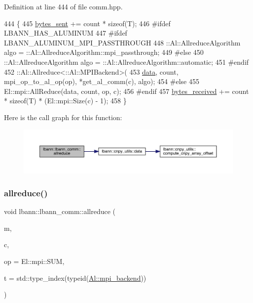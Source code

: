 Definition at line 444 of file comm.\+hpp.


\begin{DoxyCode}
444                                                                                \{
445     \hyperlink{classlbann_1_1lbann__comm_ad1f146ae7337ece6266fd307944928e0}{bytes\_sent} += count * \textcolor{keyword}{sizeof}(T);
446 \textcolor{preprocessor}{#ifdef LBANN\_HAS\_ALUMINUM}
447 \textcolor{preprocessor}{#ifdef LBANN\_ALUMINUM\_MPI\_PASSTHROUGH}
448     ::Al::AllreduceAlgorithm algo = ::Al::AllreduceAlgorithm::mpi\_passthrough;
449 \textcolor{preprocessor}{#else}
450     ::Al::AllreduceAlgorithm algo = ::Al::AllreduceAlgorithm::automatic;
451 \textcolor{preprocessor}{#endif}
452     ::Al::Allreduce<::Al::MPIBackend>(
453       \hyperlink{namespacelbann_1_1cnpy__utils_a9ac86d96ccb1f8b4b2ea16441738781f}{data}, count, mpi\_op\_to\_al\_op(op), *get\_al\_comm(c), algo);
454 \textcolor{preprocessor}{#else}
455     El::mpi::AllReduce(data, count, op, c);
456 \textcolor{preprocessor}{#endif}
457     \hyperlink{classlbann_1_1lbann__comm_afb99f57f7eafc0695bf28e6c26a8120f}{bytes\_received} += count * \textcolor{keyword}{sizeof}(T) * (El::mpi::Size(c) - 1);
458   \}
\end{DoxyCode}
Here is the call graph for this function\+:\nopagebreak
\begin{figure}[H]
\begin{center}
\leavevmode
\includegraphics[width=350pt]{classlbann_1_1lbann__comm_a14adb0771b966f40536bf0e92fb00ebb_cgraph}
\end{center}
\end{figure}
\mbox{\label{classlbann_1_1lbann__comm_adaff1e6549a3fb902c85f1be2718c1ff}} 
\subsubsection{\texorpdfstring{allreduce()}{allreduce()}\hspace{0.1cm}{\footnotesize\ttfamily [4/4]}}
{\footnotesize\ttfamily void lbann\+::lbann\+\_\+comm\+::allreduce (\begin{DoxyParamCaption}\item[{\hyperlink{base_8hpp_a9a697a504ae84010e7439ffec862b470}{Abs\+Dist\+Mat} \&}]{m,  }\item[{const El\+::mpi\+::\+Comm}]{c,  }\item[{El\+::mpi\+::\+Op}]{op = {\ttfamily El\+:\+:mpi\+:\+:SUM},  }\item[{std\+::type\+\_\+index}]{t = {\ttfamily std\+:\+:type\+\_\+index(typeid(\hyperlink{namespacelbann_1_1Al_a8a69c2fac7e1117883fff1903c2232ce}{Al\+::mpi\+\_\+backend}))} }\end{DoxyParamCaption})}

